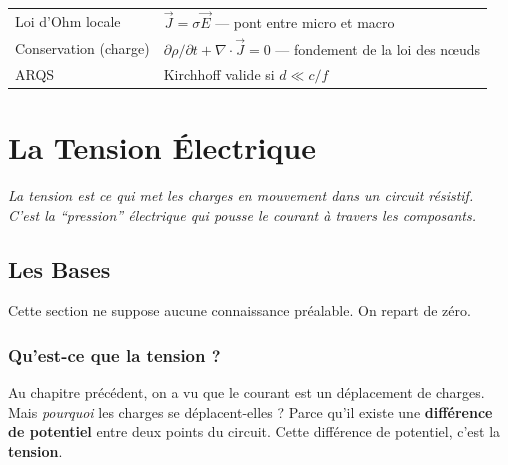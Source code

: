 \documentclass[12pt,a4paper,twoside]{book}
\begin{document}
\begin{ingenieur}[title={\color{white} Résumé --- Niveau Ingénieur}]
\begin{center}
\renewcommand{\arraystretch}{1.3}
\begin{tabular}{p{4cm}p{9cm}}
\toprule
Loi d'Ohm locale & $\vec{J} = \sigma \vec{E}$ --- pont entre micro et macro \\
Conservation (charge) & $\partial\rho/\partial t + \nabla\cdot\vec{J} = 0$ --- fondement de la loi des n\oe uds \\
ARQS & Kirchhoff valide si $d \ll c/f$ \\
\bottomrule
\end{tabular}
\end{center}
\end{ingenieur}

\chapter{La Tension Électrique}

\begin{center}
\textit{La tension est ce qui met les charges en mouvement dans un circuit résistif.\\
C'est la ``pression'' électrique qui pousse le courant à travers les composants.}
\end{center}

\vspace{0.5cm}

\section{Les Bases}

\begin{bases}
Cette section ne suppose aucune connaissance préalable. On repart de zéro.
\end{bases}

\subsection{Qu'est-ce que la tension ?}

Au chapitre précédent, on a vu que le courant est un déplacement de charges. Mais \textit{pourquoi} les charges se déplacent-elles ? Parce qu'il existe une \textbf{différence de potentiel} entre deux points du circuit. Cette différence de potentiel, c'est la \textbf{tension}.
\end{document}
